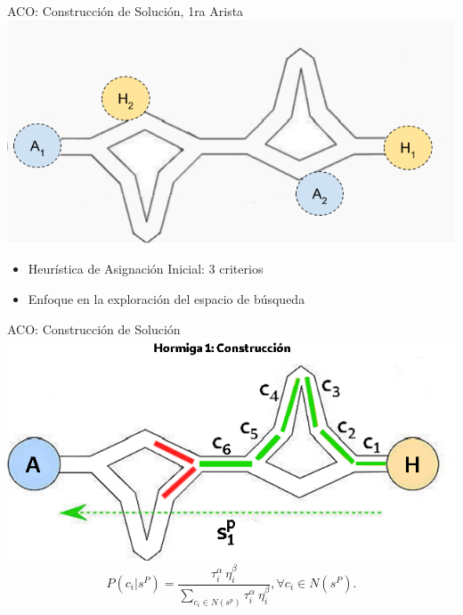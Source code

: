 \begin{frame}{ACO: Construcci\'on de Soluci\'on, 1ra Arista}
    \centering
    \includegraphics[scale=0.5]{Pictures/ant-initial-edge.png}
    \begin{itemize}
        \item Heur\'istica de Asignaci\'on Inicial: 3 criterios
        \item Enfoque en la exploraci\'on del espacio de b\'usqueda
    \end{itemize}
\end{frame}

\begin{frame}{ACO: Construcci\'on de Soluci\'on}
\centering
\includegraphics[scale=0.35]{Pictures/ACO-ant-Constr-choices.png}
        \begin{equation}
P(c_{i} | s^{P}) = \frac
        {\tau_{i}^{\alpha} ~ \eta_{i}^{\beta}}
        {\sum\limits_{c_{i}\in N(s^p)}{\tau_{i}^{\alpha} ~ \eta_{i}^{\beta} } }, \forall c_{i} \in N(s^{P}).
\label{eq:antProbabilities}
\end{equation}
\end{frame}

